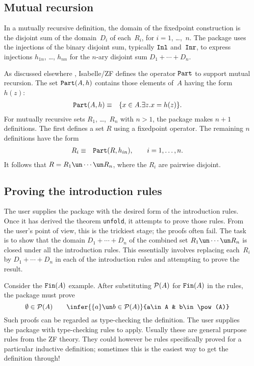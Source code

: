 \subsection{Mutual recursion} \label{mutual-sec}
In a mutually recursive definition, the domain of the fixedpoint construction
is the disjoint sum of the domain~$D_i$ of each~$R_i$, for $i=1$,
\ldots,~$n$.  The package uses the injections of the
binary disjoint sum, typically $\hbox{\tt Inl}$ and~$\hbox{\tt Inr}$, to express injections
$h_{1n}$, \ldots, $h_{nn}$ for the $n$-ary disjoint sum $D_1+\cdots+D_n$.

As discussed elsewhere \cite[\S4.5]{paulson-set-II}, Isabelle/ZF defines the
operator $\hbox{\tt Part}$ to support mutual recursion.  The set $\hbox{\tt Part}(A,h)$
contains those elements of~$A$ having the form~$h(z)$:
\begin{eqnarray*}
   \hbox{\tt Part}(A,h)  & \equiv & \{x\in A. \exists z. x=h(z)\}.
\end{eqnarray*}   
For mutually recursive sets $R_1$, \ldots,~$R_n$ with
$n>1$, the package makes $n+1$ definitions.  The first defines a set $R$ using
a fixedpoint operator. The remaining $n$ definitions have the form
\begin{eqnarray*}
  R_i & \equiv & \hbox{\tt Part}(R,h_{in}), \qquad i=1,\ldots, n.
\end{eqnarray*} 
It follows that $R=R_1\un\cdots\un R_n$, where the $R_i$ are pairwise disjoint.


\subsection{Proving the introduction rules}
The user supplies the package with the desired form of the introduction
rules.  Once it has derived the theorem {\tt unfold}, it attempts
to prove those rules.  From the user's point of view, this is the
trickiest stage; the proofs often fail.  The task is to show that the domain 
$D_1+\cdots+D_n$ of the combined set $R_1\un\cdots\un R_n$ is
closed under all the introduction rules.  This essentially involves replacing
each~$R_i$ by $D_1+\cdots+D_n$ in each of the introduction rules and
attempting to prove the result.

Consider the $\hbox{\tt Fin}(A)$ example.  After substituting ${\cal P}(A)$ for $\hbox{\tt Fin}(A)$
in the rules, the package must prove
\[  \emptyset\in\pow(A)  \qquad 
    \infer{\{a\}\un b\in\pow(A)}{a\in A & b\in\pow(A)} 
\]
Such proofs can be regarded as type-checking the definition.  The user
supplies the package with type-checking rules to apply.  Usually these are
general purpose rules from the ZF theory.  They could however be rules
specifically proved for a particular inductive definition; sometimes this is
the easiest way to get the definition through!

